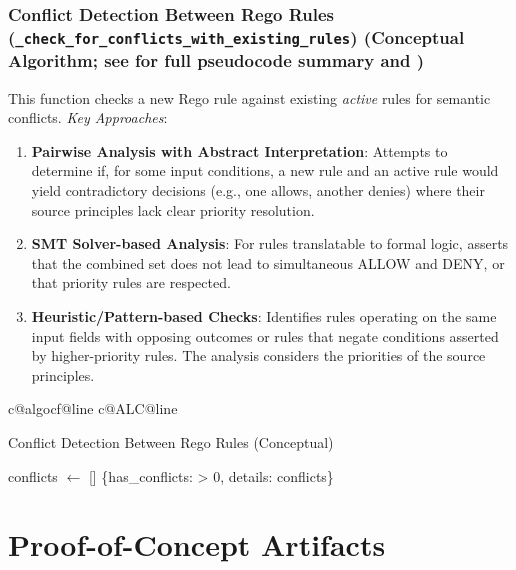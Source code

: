 \documentclass[sigconf,natbib]{acmart}
\makeatletter
\newcounter{algcounter}
\newcounter{alglinegs}
\newcounter{alglinepgc}
\newcounter{alglinevalidation}
\newcounter{alglinesafety}
\newcounter{alglineconflict}
\newcounter{alglinebias}
\newcommand{\resetalglineno}{%
  \stepcounter{algcounter}%
  \setcounter{ALG@line}{0}%
  \setcounter{alglinegs}{0}%
  \setcounter{alglinepgc}{0}%
  \setcounter{alglinevalidation}{0}%
  \setcounter{alglinesafety}{0}%
  \setcounter{alglineconflict}{0}%
  \setcounter{alglinebias}{0}%
  \ifcsname c@algocf@line\endcsname\setcounter{algocf@line}{0}\fi%
  \ifcsname c@ALC@line\endcsname\setcounter{ALC@line}{0}\fi%
}
\makeatother
\begin{document}
\subsubsection[Conflict Detection Between Rego Rules]{Conflict Detection Between Rego Rules (\texttt{\_check\_for\_conflicts\_with\_existing\_rules}) (Conceptual Algorithm; see  for full pseudocode summary and )}
\label{app:conflict_detection_subsection}
This function checks a new Rego rule against existing \textit{active} rules for semantic conflicts. \textit{Key Approaches}:
\begin{enumerate}
    \item \textbf{Pairwise Analysis with Abstract Interpretation}: Attempts to determine if, for some input conditions, a new rule and an active rule would yield contradictory decisions (e.g., one allows, another denies) where their source principles lack clear priority resolution.
    \item \textbf{SMT Solver-based Analysis}: For rules translatable to formal logic, asserts that the combined set does not lead to simultaneous ALLOW and DENY, or that priority rules are respected.
    \item \textbf{Heuristic/Pattern-based Checks}: Identifies rules operating on the same input fields with opposing outcomes or rules that negate conditions asserted by higher-priority rules. The analysis considers the priorities of the source principles.
\end{enumerate}

\begin{algorithm}[!htbp]
\resetalglineno
\caption{Conflict Detection Between Rego Rules (Conceptual)}
\label{alg:conflict_detect_conceptual_appendix}
\begin{algorithmic}[1]
  \State conflicts $\gets$ []
      \State {}
    \EndIf
  \EndFor
  \State \Return \{has\_conflicts:  > 0, details: conflicts\}
\EndFunction
\end{algorithmic}
\end{algorithm}

\section{Proof-of-Concept Artifacts}
\label{app:poc_artifacts}
\end{document}
